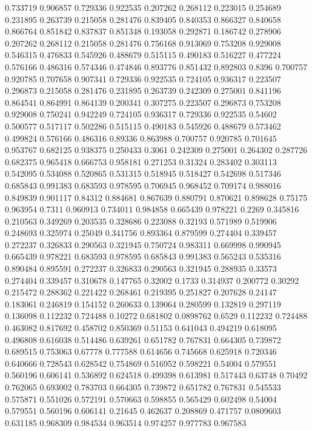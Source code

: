 0.733719 0.906857
0.729336 0.922535
0.207262 0.268112
0.223015 0.254689
0.231895 0.263739
0.215058 0.281476
0.839405 0.840353
0.866327 0.840658
0.866764 0.851842
0.837837 0.851348
0.193058 0.292871
0.186742 0.278906
0.207262 0.268112
0.215058 0.281476
0.756168 0.913069
0.753208 0.929008
0.546315 0.476833
0.545926 0.488679
0.515115 0.490183
0.516227 0.477224
0.576166 0.486316
0.574346 0.474846
0.893776 0.851432
0.892803 0.8396
0.700757 0.920785
0.707658 0.907341
0.729336 0.922535
0.724105 0.936317
0.223507 0.296873
0.215058 0.281476
0.231895 0.263739
0.242309 0.275001
0.841196 0.864541
0.864991 0.864139
0.200341 0.307275
0.223507 0.296873
0.753208 0.929008
0.750241 0.942249
0.724105 0.936317
0.729336 0.922535
0.54602 0.500577
0.517117 0.502286
0.515115 0.490183
0.545926 0.488679
0.573462 0.499824
0.576166 0.486316
0.89336 0.863988
0.700757 0.920785
0.701645 0.953767
0.682125 0.938375
0.250433 0.3061
0.242309 0.275001
0.264302 0.287726
0.682375 0.965418
0.666753 0.958181
0.271253 0.31324
0.283402 0.303113
0.542095 0.534088
0.520865 0.531315
0.518945 0.518427
0.542698 0.517346
0.685843 0.991383
0.683593 0.978595
0.706945 0.968452
0.709174 0.988016
0.849839 0.901117
0.84312 0.884681
0.867639 0.880791
0.870621 0.898628
0.75175 0.963954
0.7311 0.960913
0.734011 0.984858
0.665439 0.978221
0.2269 0.345816
0.210563 0.349269
0.203535 0.328686
0.223088 0.32193
0.571989 0.519906
0.248693 0.325974
0.25049 0.341756
0.893364 0.879599
0.274404 0.339457
0.272237 0.326833
0.290563 0.321945
0.750724 0.983311
0.669998 0.990945
0.665439 0.978221
0.683593 0.978595
0.685843 0.991383
0.565243 0.535316
0.890484 0.895591
0.272237 0.326833
0.290563 0.321945
0.288935 0.33573
0.274404 0.339457
0.310678 0.147765
0.32002 0.1733
0.314937 0.200772
0.30292 0.215472
0.288362 0.221422
0.268461 0.219395
0.251827 0.207628
0.24147 0.183061
0.246819 0.154152
0.260633 0.139064
0.280599 0.132819
0.297119 0.136098
0.112232 0.724488
0.10272 0.681802
0.0898762 0.6529
0.112232 0.724488
0.463082 0.817692
0.458702 0.850369
0.51153 0.641043
0.494219 0.618095
0.496808 0.616038
0.514486 0.639261
0.651782 0.767831
0.664305 0.739872
0.689515 0.753063
0.67778 0.777588
0.614656 0.745668
0.625918 0.720346
0.640666 0.728543
0.628542 0.754869
0.516952 0.598221
0.54004 0.579551
0.560196 0.606141
0.536892 0.624518
0.499398 0.613981
0.517443 0.63748
0.70492 0.762065
0.693002 0.783703
0.664305 0.739872
0.651782 0.767831
0.545533 0.575871
0.551026 0.572191
0.570663 0.598855
0.565429 0.602498
0.54004 0.579551
0.560196 0.606141
0.21645 0.462637
0.208869 0.471757
0.0809603 0.631185
0.968309 0.984534
0.963514 0.974257
0.977783 0.967583
